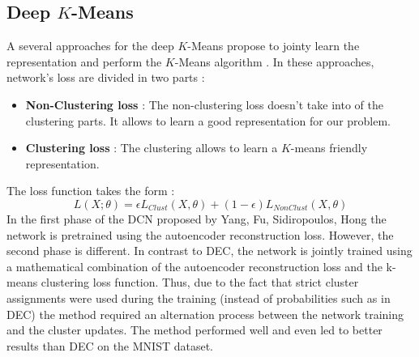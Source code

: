 \subsection{Deep $K$-Means}
A several approaches for the deep $K$-Means propose to jointy learn the
representation and perform the $K$-Means algorithm \cite{2018arXiv180107648A}.
In these approaches, network's loss are divided in two parts :
\begin{itemize}
\item \textbf{Non-Clustering loss} : The non-clustering loss doesn't take into 
of the clustering parts. It allows to learn a good representation for our 
problem.
\item \textbf{Clustering loss} : The clustering allows to learn a $K$-means 
friendly representation.
\end{itemize}
The loss function takes the form :
$$
L(X;\theta) = \epsilon L_{Clust}(X,\theta) + (1-\epsilon)L_{NonClust}(X,\theta)
$$
In the first phase of the DCN proposed by Yang, Fu, Sidiropoulos, Hong 
\cite{2016arXiv161004794Y}
the network is pretrained using the autoencoder reconstruction loss. However, 
the second phase is different. In contrast to DEC, the network is jointly trained using a mathematical combination of the autoencoder reconstruction loss and the k-means clustering loss function. Thus, due to the fact that strict cluster assignments were used during the training (instead of probabilities such as in DEC) the method required an alternation process between the network training and the cluster updates. The method performed well and even led to better results than DEC on the MNIST dataset.
